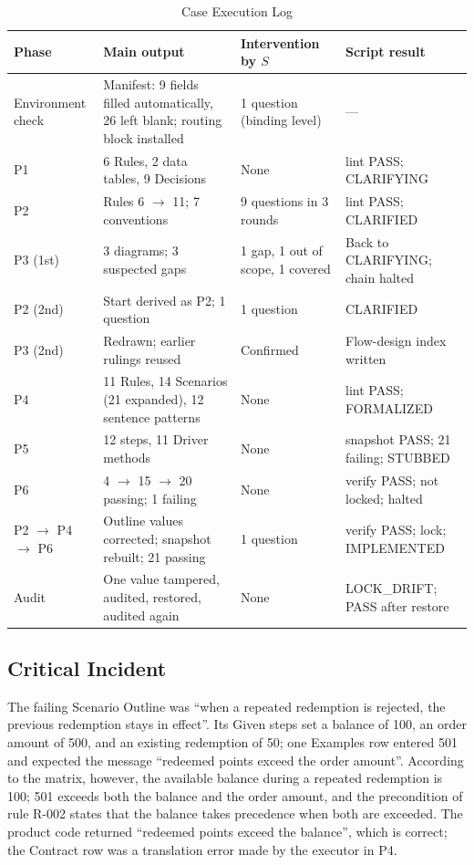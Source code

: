 \documentclass[conference]{IEEEtran}
\begin{document}
\begin{table}[t]
\caption{Case Execution Log}\label{tab:caselog}
\centering\footnotesize
\begin{tabularx}{\textwidth}{@{}lLll@{}}
\toprule
Phase & Main output & Intervention by $S$ & Script result \\
\midrule
Environment check & Manifest: 9 fields filled automatically, 26 left blank; routing block installed & 1 question (binding level) & --- \\
P1 & 6 Rules, 2 data tables, 9 Decisions & None & lint PASS; CLARIFYING \\
P2 & Rules 6 $\rightarrow$ 11; 7 conventions & 9 questions in 3 rounds & lint PASS; CLARIFIED \\
P3 (1st) & 3 diagrams; 3 suspected gaps & 1 gap, 1 out of scope, 1 covered & Back to CLARIFYING; chain halted \\
P2 (2nd) & Start derived as P2; 1 question & 1 question & CLARIFIED \\
P3 (2nd) & Redrawn; earlier rulings reused & Confirmed & Flow-design index written \\
P4 & 11 Rules, 14 Scenarios (21 expanded), 12 sentence patterns & None & lint PASS; FORMALIZED \\
P5 & 12 steps, 11 Driver methods & None & snapshot PASS; 21 failing; STUBBED \\
P6 & 4 $\rightarrow$ 15 $\rightarrow$ 20 passing; 1 failing & None & verify PASS; not locked; halted \\
P2 $\rightarrow$ P4 $\rightarrow$ P6 & Outline values corrected; snapshot rebuilt; 21 passing & 1 question & verify PASS; lock; IMPLEMENTED \\
Audit & One value tampered, audited, restored, audited again & None & LOCK\_DRIFT; PASS after restore \\
\bottomrule
\end{tabularx}
\end{table}

\subsection{Critical Incident}\label{sec:incident}

The failing Scenario Outline was ``when a repeated redemption is rejected, the previous redemption stays in effect''. Its Given steps set a balance of 100, an order amount of 500, and an existing redemption of 50; one Examples row entered 501 and expected the message ``redeemed points exceed the order amount''. According to the matrix, however, the available balance during a repeated redemption is 100; 501 exceeds both the balance and the order amount, and the precondition of rule R-002 states that the balance takes precedence when both are exceeded. The product code returned ``redeemed points exceed the balance'', which is correct; the Contract row was a translation error made by the executor in P4.
\end{document}
